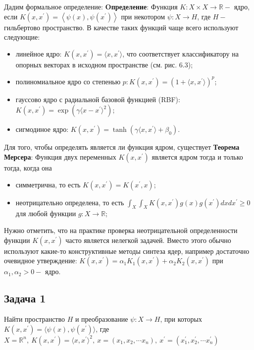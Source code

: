 Дадим формальное определение:\newline
\textbf{Oпределение}:\newline
Функция $K: X \times X \rightarrow \mathbb{R}-$ ядро, если $K\left(x, x^{\prime}\right)=\left\langle\psi(x), \psi\left(x^{\prime}\right)\right\rangle$
при некотором $\psi: X \rightarrow H$, где $H-$ гильбертово пространство. \newline
В качестве таких функций чаще всего используют следующие:
\begin{itemize}
\item линейное ядро: $K(x, x^{\prime})=\langle x, x^{\prime} \rangle$, что соответствует классификатору на опорных векторах в исходном пространстве (см. рис. 6.3);
\item полиномиальное ядро со степенью $p: K(x, x^{\prime})=(1+\langle x, x^{\prime} \rangle)^p$;
\item гауссово ядро с радиальной базовой функцией (RBF): $K(x, x^{\prime})=\exp(\gamma\langle x - x^{\prime} \rangle^2)$;
\item сигмодиное ядро: $K(x, x^{\prime})=\tanh(\gamma\langle x, x^{\prime}\rangle+\beta_0)$.
\end{itemize}

Для того, чтобы определять является ли функция ядром, существует\newline
\textbf{Теорема Мерсера}:\newline
Функция двух переменных $K\left(x, x^{\prime}\right)$ является ядром тогда и только тогда, когда она
\begin{itemize}
\item симметрична, то есть $K\left(x, x^{\prime}\right)=K\left(x^{\prime}, x\right)$;
\item неотрицательно определена, то есть $\int_X \int_X K\left(x, x^{\prime}\right) g(x) g\left(x^{\prime}\right) d x d x^{\prime} \geq 0$ для любой функции $g: X \rightarrow \mathbb{R}$;
\end{itemize}

Нужно отметить, что на практике проверка неотрицательной определенности функции $K\left(x, x^{\prime}\right)$ часто является нелегкой задачей.
Вместо этого обычно используют какие-то конструктивные методы синтеза ядер, например достаточно очевидное утверждение: $K\left(x, x^{\prime}\right)=\alpha_1 K_1\left(x, x^{\prime}\right)+\alpha_2 K_2\left(x, x^{\prime}\right)$ при $\alpha_1, \alpha_2>0-$ ядро.

\subsection{Задача 1}
Найти пространство $H$ и преобразование $\psi: X \rightarrow H$, при которых
$K(x, x^{\prime}) = \langle \psi(x),\psi(x^{\prime}) \rangle $, где $X = \mathbb{R}^n,~
K(x, x^{\prime}) = \langle x, x^{\prime} \rangle^2,~ x = (x_1, x_2, \cdots x_n),~ x^{\prime} = (x_1^{\prime}, x_2^{\prime}, \cdots x_n^{\prime})$
